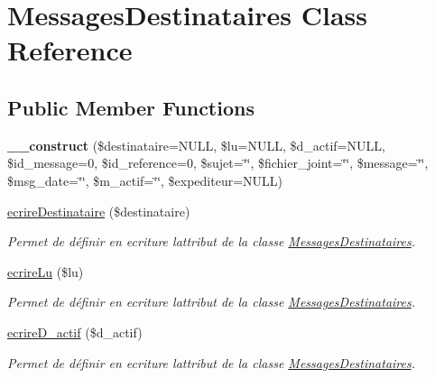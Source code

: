 \hypertarget{class_messages_destinataires}{}\section{Messages\+Destinataires Class Reference}
\label{class_messages_destinataires}
\subsection*{Public Member Functions}
\begin{DoxyCompactItemize}
\item 
\mbox{\label{class_messages_destinataires_a8a49617c281c154caa954e1217a483e5}} 
{\bfseries \+\_\+\+\_\+construct} (\$destinataire=N\+U\+LL, \$lu=N\+U\+LL, \$d\+\_\+actif=N\+U\+LL, \$id\+\_\+message=0, \$id\+\_\+reference=0, \$sujet=\char`\"{}\char`\"{}, \$fichier\+\_\+joint=\char`\"{}\char`\"{}, \$message=\char`\"{}\char`\"{}, \$msg\+\_\+date=\char`\"{}\char`\"{}, \$m\+\_\+actif=\char`\"{}\char`\"{}, \$expediteur=N\+U\+LL)
\item 
\hyperlink{class_messages_destinataires_ad7f35821dba9807a777bca63e47dd681}{ecrire\+Destinataire} (\$destinataire)
\begin{DoxyCompactList}\small\item\em Permet de définir en ecriture l\textquotesingle{}attribut de la classe \hyperlink{class_messages_destinataires}{Messages\+Destinataires}. \end{DoxyCompactList}\item 
\hyperlink{class_messages_destinataires_ad10c883539e985ff80bcb9e7a675edb4}{ecrire\+Lu} (\$lu)
\begin{DoxyCompactList}\small\item\em Permet de définir en ecriture l\textquotesingle{}attribut de la classe \hyperlink{class_messages_destinataires}{Messages\+Destinataires}. \end{DoxyCompactList}\item 
\hyperlink{class_messages_destinataires_a7eb6aa2be8097b67dad0365625d9cc9c}{ecrire\+D\+\_\+actif} (\$d\+\_\+actif)
\begin{DoxyCompactList}\small\item\em Permet de définir en ecriture l\textquotesingle{}attribut de la classe \hyperlink{class_messages_destinataires}{Messages\+Destinataires}. \end{DoxyCompactList}\item 

\end{DoxyCompactItemize}
